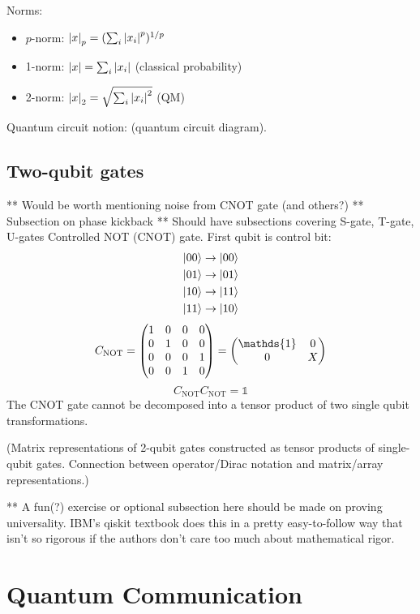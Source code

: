 \documentclass[12pt]{article}
\newcommand*\id{\mathds{1}}
\begin{document}
Norms:
\begin{itemize}
    \item $p$-norm: $\abs{x}_p = (\sum_i \abs{x_i}^p)^{1/p}$
    \item 1-norm: $\abs{x} = \sum_i \abs{x_i}$ (classical probability)
    \item 2-norm: $\abs{x}_2 = \sqrt{\sum_i \abs{x_i}^2}$ (QM)
\end{itemize}

Quantum circuit notion: (quantum circuit diagram).

\subsection{Two-qubit gates}
** Would be worth mentioning noise from CNOT gate (and others?)
** Subsection on phase kickback
** Should have subsections covering S-gate, T-gate, U-gates
Controlled NOT (CNOT) gate. First qubit is control bit:
\begin{alignat}{1}
    \ket{00} &\rightarrow \ket{00} \\
    \ket{01} &\rightarrow \ket{01} \\
    \ket{10} &\rightarrow \ket{11} \\
    \ket{11} &\rightarrow \ket{10}
\end{alignat}
\[C_\text{NOT} = \pmqty{\mqty{\imat{2}}&\mqty{\zmat{2}{2}}
                    \\ \mqty{\zmat{2}{2}}&\mqty{\pmat{1}}}
            = \pmqty{\id&0\\0&X}\]
\[C_\text{NOT}C_\text{NOT} = \id\]
The CNOT gate cannot be decomposed into a tensor product of two single qubit
transformations.

(Matrix representations of 2-qubit gates constructed as tensor products of
single-qubit gates. Connection between operator/Dirac notation and matrix/array
representations.)

** A fun(?) exercise or optional subsection here should be made on proving universality. IBM's qiskit textbook does this in a pretty easy-to-follow way that isn't so rigorous if the authors don't care too much about mathematical rigor. 


\section{Quantum Communication}


\vspace{2ex}\noindent
{}
\end{document}
